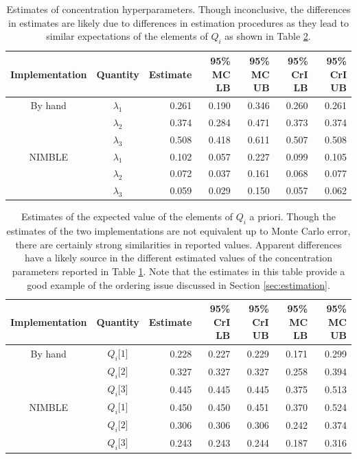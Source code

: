 \documentclass{article}
\begin{document}
\begin{table}[]
\centering
\caption{Estimates of concentration hyperparameters. Though inconclusive, the differences in estimates are likely due to differences in estimation procedures as they lead to similar expectations of the elements of $Q_i$ as shown in Table \ref{tab:expectations}.}
\label{tab:concentration}
\begin{tabular}{ccrrrrr}
\hline
Implementation & Quantity  & Estimate & 95\% MC LB & 95\% MC UB & 95\% CrI LB & 95\% CrI UB \\
\hline
By hand        & $\lambda_1$ & 0.261    & 0.190      & 0.346      & 0.260       & 0.261       \\
               & $\lambda_2$ & 0.374    & 0.284      & 0.471      & 0.373       & 0.374       \\
               & $\lambda_3$ & 0.508    & 0.418      & 0.611      & 0.507       & 0.508       \\
               \hline
NIMBLE         & $\lambda_1$ & 0.102    & 0.057      & 0.227      & 0.099       & 0.105       \\
               & $\lambda_2$ & 0.072    & 0.037      & 0.161      & 0.068       & 0.077       \\
               & $\lambda_3$ & 0.059    & 0.029      & 0.150      & 0.057       & 0.062      
\end{tabular}
\end{table}

\begin{table}[]
\centering
\caption{Estimates of the expected value of the elements of $Q_i$ a priori. Though the estimates of the two implementations are not equivalent up to Monte Carlo error, there are certainly strong similarities in reported values. Apparent differences have a likely source in the different estimated values of the concentration parameters reported in Table \ref{tab:concentration}. Note that the estimates in this table provide a good example of the ordering issue discussed in Section \ref{sec:estimation}.} 
\label{tab:expectations}
\begin{tabular}{ccrrrrr}
\hline
Implementation & Quantity    & Estimate & 95\% CrI LB & 95\% CrI UB & 95\% MC LB & 95\% MC UB  \\
\hline
By hand        & $Q_i{[}1{]}$ & 0.228    & 0.227      & 0.229      & 0.171       & 0.299       \\
               & $Q_i{[}2{]}$ & 0.327    & 0.327      & 0.327      & 0.258       & 0.394       \\
               & $Q_i{[}3{]}$ & 0.445    & 0.445      & 0.445      & 0.375       & 0.513       \\
               \hline
NIMBLE         & $Q_i{[}1{]}$ & 0.450    & 0.450      & 0.451      & 0.370       & 0.524       \\
               & $Q_i{[}2{]}$ & 0.306    & 0.306      & 0.306      & 0.242       & 0.374       \\
               & $Q_i{[}3{]}$ & 0.243    & 0.243      & 0.244      & 0.187       & 0.316      
\end{tabular}
\end{table}
\end{document}
